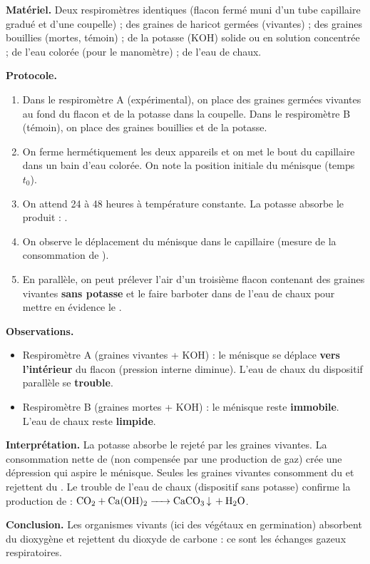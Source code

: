 \documentclass[11pt]{article}
\newcommand{\cle}[1]{{\popxbold\color{popdark}#1}}
\begin{document}
\begin{experience}
\textbf{Matériel.} Deux respiromètres identiques (flacon fermé muni d'un tube capillaire gradué et d'une coupelle) ; des graines de haricot germées (vivantes) ; des graines bouillies (mortes, témoin) ; de la potasse (KOH) solide ou en solution concentrée ; de l'eau colorée (pour le manomètre) ; de l'eau de chaux.

\textbf{Protocole.}
\begin{enumerate}
\item Dans le respiromètre A (expérimental), on place des graines germées vivantes au fond du flacon et de la potasse dans la coupelle. Dans le respiromètre B (témoin), on place des graines bouillies et de la potasse.
\item On ferme hermétiquement les deux appareils et on met le bout du capillaire dans un bain d'eau colorée. On note la position initiale du ménisque (temps $t_0$).
\item On attend 24 à 48 heures à température constante. La potasse absorbe le  produit : .
\item On observe le déplacement du ménisque dans le capillaire (mesure de la consommation de ).
\item En parallèle, on peut prélever l'air d'un troisième flacon contenant des graines vivantes \textbf{sans potasse} et le faire barboter dans de l'eau de chaux pour mettre en évidence le .
\end{enumerate}

\textbf{Observations.}
\begin{itemize}
\item Respiromètre A (graines vivantes + KOH) : le ménisque se déplace \textbf{vers l'intérieur} du flacon (pression interne diminue). L'eau de chaux du dispositif parallèle se \textbf{trouble}.
\item Respiromètre B (graines mortes + KOH) : le ménisque reste \textbf{immobile}. L'eau de chaux reste \textbf{limpide}.
\end{itemize}

\textbf{Interprétation.} La potasse absorbe le  rejeté par les graines vivantes. La consommation nette de  (non compensée par une production de gaz) crée une dépression qui aspire le ménisque. Seules les graines vivantes consomment du  et rejettent du . Le trouble de l'eau de chaux (dispositif sans potasse) confirme la production de  : $\ce{CO2 + Ca(OH)2 -> CaCO3 v + H2O}$.

\textbf{Conclusion.} Les organismes vivants (ici des végétaux en germination) absorbent du dioxygène et rejettent du dioxyde de carbone : ce sont les \cle{échanges gazeux respiratoires}.
\end{experience}
\end{document}
